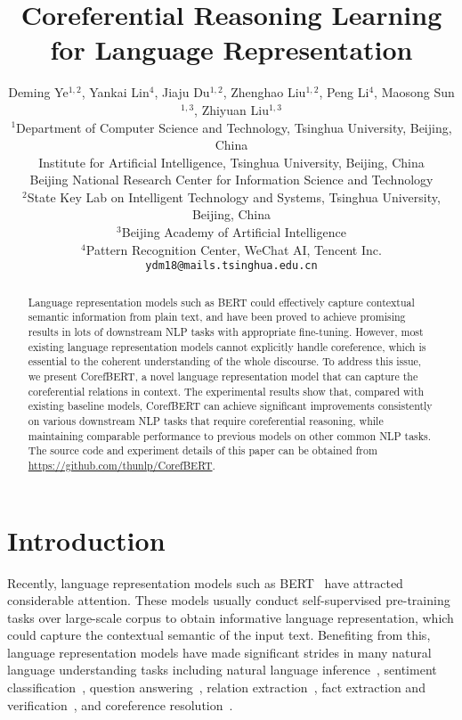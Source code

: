 \documentclass[11pt,a4paper]{article}
\title{Coreferential Reasoning Learning for Language Representation}
\author{Deming Ye$^{1,2}$, Yankai Lin$^{4}$, Jiaju Du$^{1,2}$, Zhenghao Liu$^{1,2}$,  Peng Li$^{4}$, Maosong Sun$^{1,3}$, Zhiyuan Liu$^{1,3}$\\
$^1$Department of Computer Science and Technology, Tsinghua University, Beijing, China\\
Institute for Artificial Intelligence, Tsinghua University, Beijing, China\\
Beijing National Research Center for Information Science and Technology\\
$^2$State Key Lab on Intelligent Technology and Systems, Tsinghua University, Beijing, China\\
$^3$Beijing Academy of Artificial Intelligence \\
$^{4}$Pattern Recognition Center, WeChat AI, Tencent Inc.\\
\texttt{ydm18@mails.tsinghua.edu.cn}
}
\date{}
\begin{document}
\maketitle
\begin{abstract}

Language representation models such as BERT could effectively capture contextual semantic information from plain text, and have been proved to achieve promising results in lots of downstream NLP tasks with appropriate fine-tuning. 
However, most existing language representation models cannot explicitly handle coreference, which is essential to the coherent understanding of the whole discourse.
To address this issue, we present CorefBERT, a novel language representation model that can capture the coreferential relations in context.
The experimental results show that, compared with existing baseline models,  CorefBERT can achieve significant improvements consistently on various downstream NLP tasks that require coreferential reasoning, while maintaining comparable performance to previous models on other common NLP tasks. The source code and experiment details of this paper can be obtained from \url{https://github.com/thunlp/CorefBERT}.


\end{abstract}




\section{Introduction}




Recently, language representation models such as BERT~\citep{BERT} have attracted considerable attention. These models usually conduct self-supervised pre-training tasks over large-scale corpus to obtain informative language representation, which could capture the contextual semantic of the input text. 
Benefiting from this, language representation models have made significant strides in many natural language understanding tasks including natural language inference~\citep{nlibert},  sentiment classification~\citep{sentimentbert}, question answering~\citep{qabert}, relation extraction~\citep{peters-etal-2019-knowledge}, fact extraction and verification~\citep{Zhoujie}, and coreference resolution~\citep{bertforcoref}.
\end{document}
